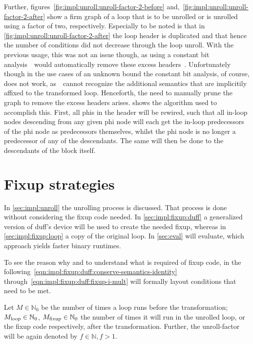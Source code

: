 Further, figures~\ref{fig:impl:unroll:unroll-factor-2-before} and,~\ref{fig:impl:unroll:unroll-factor-2-after} show a firm graph of a loop that is to be unrolled or is unrolled using a factor of two, respectively.
Especially to be noted is that in \cref{fig:impl:unroll:unroll-factor-2-after} the loop header is duplicated and that hence the number of conditions did not decrease through the loop unroll.
With the previous usage, this was not an issue though, as using a constant bit analysis~\libFIRM~would automatically remove these excess headers~\cite{aebi18bachelorarbeit}.
Unfortunately though in the use cases of an unknown bound the constant bit analysis, of course, does not work, as~\libFIRM~cannot recognize the additional semantics that are implicitily affixed to the transformed loop.
Henceforth, the need to manually prune the graph to remove the excess headers arises.
 shows the algorithm used to accomplish this.
First, all phis in the header will be rewired, such that all in-loop nodes descending from any given phi node will each get the in-loop predecessors of the phi node as predecessors themselves, whilst the phi node is no longer a predecessor of any of the descendants.
The same will then be done to the descendants of the block itself.







\section{Fixup strategies}\label{sec:impl:fixup}

In \cref{sec:impl:unroll} the unrolling process is discussed.
That process is done without considering the fixup code needed.
In \cref{sec:impl:fixup:duff} a generalized version of duff's device will be used to create the needed fixup, whereas in \cref{sec:impl:fixup:loop} a copy of the original loop.
In \cref{sec:eval} will evaluate, which approach yields faster binary runtimes.

To see the reason why and to understand what is required of fixup code, in the following~\cref{eqn:impl:fixup:duff:conserve-semantics-identity} through~\cref{eqn:impl:fixup:duff:fixup-i-mult} will formally layout conditions that need to be met.

Let $M \in \mathbb{N}_0$ be the number of times a loop runs before the transformation; $M_{\text{loop}} \in \mathbb{N}_0$, $M_{\text{fixup}} \in \mathbb{N}_0$ the number of times it will run in the unrolled loop, or the fixup code respectively, after the transformation.
Further, the unroll-factor will be again denoted by $f \in \mathbb{N}, f > 1$.


